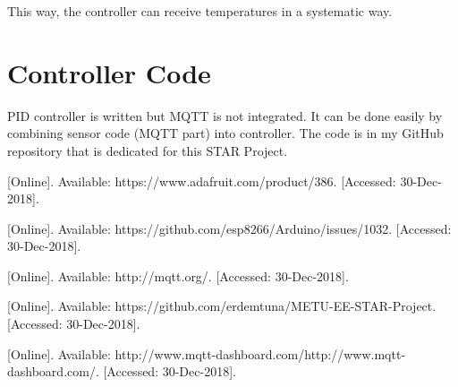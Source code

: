 \documentclass[a4paper,12pt]{article}
\begin{document}
This way, the controller can receive temperatures in a systematic way.


\section{Controller Code}

PID controller is written but MQTT is not integrated. It can be done easily by combining sensor code (MQTT part) into controller. The code is in my GitHub repository \cite{ref-starGithub} that is dedicated for this STAR Project.


\newpage
\begin{thebibliography}{}
	
	
	  [Online].
	 Available: https://www.adafruit.com/product/386.
	 [Accessed: 30-Dec-2018].
	 
	  [Online].
	 Available: https://github.com/esp8266/Arduino/issues/1032.
	 [Accessed: 30-Dec-2018].
	 
	  [Online].
	Available: http://mqtt.org/.
	[Accessed: 30-Dec-2018].
	 
	  [Online].
	Available: https://github.com/erdemtuna/METU-EE-STAR-Project.
	[Accessed: 30-Dec-2018].
	
	  [Online].
Available: http://www.mqtt-dashboard.com/http://www.mqtt-dashboard.com/.
[Accessed: 30-Dec-2018].


		
\end{thebibliography}
\end{document}
